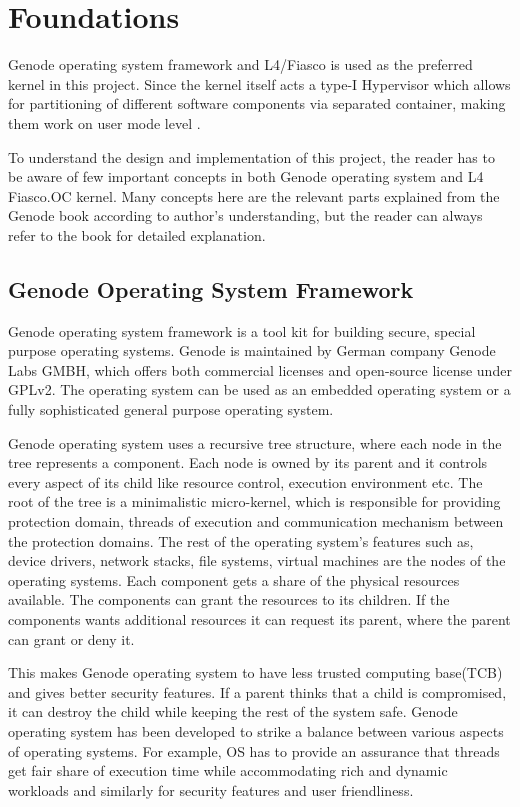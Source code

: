 \chapter{ Foundations} \label{foundations}
Genode operating system framework and L4/Fiasco is used as the preferred kernel in this project.
Since the kernel itself acts a type-I Hypervisor which allows for partitioning of different
software components via separated container, making them work on user mode level \cite{kia4sm}.

To understand the design and implementation of this project, the reader has to be aware of few important concepts in both Genode operating system and L4 Fiasco.OC kernel. Many concepts here are the relevant parts explained from the Genode book \cite{genodebook}
according to author's understanding, but the reader can always refer to the book for detailed explanation.

\section{Genode Operating System Framework} \label{foundations_genode}
Genode operating system  framework is a tool kit for building secure, special purpose operating systems. Genode is maintained by German company Genode Labs GMBH, which  offers both commercial licenses  and open-source license under GPLv2. The operating system can be used as an embedded operating system or a fully sophisticated general purpose operating system. 

Genode operating system uses a recursive tree structure, where each node in the tree represents a component. Each node is owned by its parent and it controls every aspect of its child like resource control, execution environment etc. The root of the tree is a minimalistic micro-kernel, which is responsible for providing protection domain, threads of execution and communication mechanism between the protection domains. The rest of the operating system's features such as, device drivers, network stacks, file systems, virtual machines are the nodes of the operating systems. Each component gets a share of the physical resources available. The components can grant the resources to its children. If the components wants additional resources it can request its parent, where the parent can grant or deny it.

This makes Genode operating system to have less trusted computing base(TCB) and gives better security features. If a parent thinks that a child is compromised, it can destroy the child while keeping the rest of the system safe. Genode operating system has been developed to strike a balance between various aspects of operating systems. For example, OS has to provide an assurance that threads get fair share of execution time while accommodating rich and dynamic workloads and similarly for security features and user friendliness.

